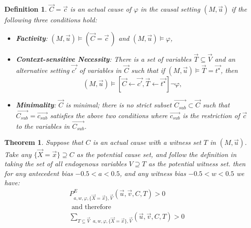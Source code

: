 \documentclass{article}
\newtheorem{theorem}{Theorem}
\newtheorem{definition}{Definition}
\begin{document}
\begin{definition} \label{def:ac}
    \(\vec{C} = \vec{c}\) is an actual cause of \(\varphi\) in the causal setting \((M, \vec{u})\) if the following three conditions hold:
    \begin{itemize}
        \item \textbf{Factivity}: \((M, \vec{u}) \vDash (\vec{C} = \vec{c}\,)\) and \((M, \vec{u}) \vDash \varphi\),
        \item \textbf{Context-sensitive Necessity}: There is a set of variables \(\vec{T} \subseteq \vec{V}\) and an alternative setting \(\vec{c'}\) of variables in \(\vec{C}\) such that if \((M, \vec{u}) \vDash \vec{T} = \vec{t^\star}\), then
            \[(M, \vec{u}) \vDash [\vec{C} \leftarrow \vec{c'}, \vec{T} \leftarrow \vec{t^\star}] \neg \varphi,\]
        \item \textbf{Minimality}: \(\vec{C}\) is minimal; there is no strict subset \(\vec{C_{sub}} \subset \vec{C}\) such that \(\vec{C_{sub}} = \vec{c_{sub}}\) satisfies the above two conditions where $\vec{c_{sub}}$ is the restriction of \(\vec{c}\) to the variables in \(\vec{C_{sub}}\). 
    \end{itemize}
\end{definition}


\begin{theorem}\label{th:ac-exp}
    Suppose that $C$ is an actual cause with a witness set $T$ in $(M, \vec{u})$. \linebreak  Take any  $\{\vec{X} = \vec{x}\} \supseteq C$ as the potential cause set, and follow the definition in taking the set of all endogenous variables $V \supseteq T$ as the potential witness set. then for any antecedent bias  $ - 0.5 < a < 0.5$, and  any witness  bias $ - 0.5 < w < 0.5$ we have: \begin{align}
    P^{E}_{a, w , \varphi, \{\vec{X} = \vec{x}\}, \vec{V}}(\vec{u}, \vec{v}, C, T) > 0 \label{eq:pect}\\
    \text{ and therefore } \nonumber\\ 
\sum_{T \subseteq \vec{V}}\, _{a, w , \varphi, \{\vec{X} = \vec{x}\}, \vec{V}}(\vec{u}, \vec{v}, C, T) > 0 \end{align}
\end{theorem}
\end{document}
